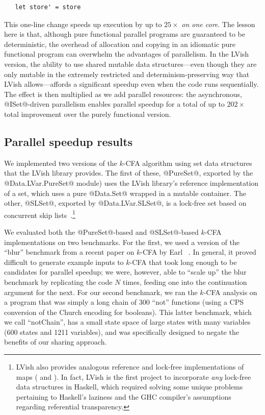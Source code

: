 \singlespacing
\begin{lstlisting}
   let store' = store 
\end{lstlisting}
\doublespacing

This one-line change speeds up execution by up to $25\times$ \emph{on
  one core}.  The lesson here is that, although pure functional
parallel programs are guaranteed to be deterministic, the overhead of
allocation and copying in an idiomatic pure functional program can
overwhelm the advantages of parallelism.  In the LVish version, the
ability to use shared mutable data structures---even though they are
only mutable in the extremely restricted and determinism-preserving
way that LVish allows---affords a significant speedup even when the
code runs sequentially.  The effect is then multiplied as we add
parallel resources: the asynchronous, @ISet@-driven parallelism
enables parallel speedup for a total of up to $202\times$ total
improvement over the purely functional version.

\subsection{Parallel speedup results}\label{subsection:lvish-parallel-speedup-results}

We implemented two versions of the $k$-CFA algorithm using set data
structures that the LVish library provides.  The first of these,
@PureSet@, exported by the @Data.LVar.PureSet@ module) uses the LVish
library's reference implementation of a set, which uses a pure
@Data.Set@ wrapped in a mutable container.  The other, @SLSet@,
exported by @Data.LVar.SLSet@, is a lock-free set based on concurrent
skip lists~\cite{art}.\footnote{LVish also provides analogous
  reference and lock-free implementations of maps ( and
  ).  In fact, LVish is the first project to incorporate
  \emph{any} lock-free data structures in Haskell, which required
  solving some unique problems pertaining to Haskell's laziness and
  the GHC compiler's assumptions regarding referential
  transparency.}

We evaluated both the @PureSet@-based and @SLSet@-based $k$-CFA
implementations on two benchmarks. For the first, we used a version of
the ``blur'' benchmark from a recent paper on $k$-CFA by Earl
\etal~.  In general, it proved difficult to
generate example inputs to $k$-CFA that took long enough to be
candidates for parallel speedup; we were, however, able to ``scale
up'' the blur benchmark by replicating the code $N$ times, feeding one
into the continuation argument for the next.  For our second
benchmark, we ran the $k$-CFA analysis on a program that was simply a
long chain of $300$ ``not'' functions (using a CPS conversion of the
Church encoding for booleans).  This latter benchmark, which we call
``notChain'', has a small state space of large states with many
variables (600 states and 1211 variables), and was specifically
designed to negate the benefits of our sharing approach.

